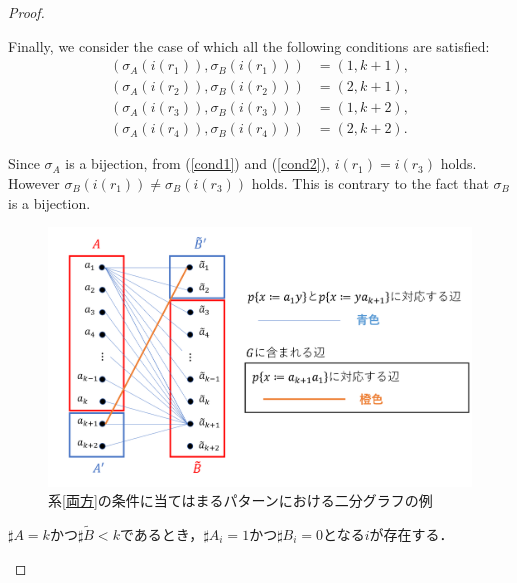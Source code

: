 \begin{proof}
\begin{enumerate}
\begin{enumerate}
Finally, we consider the case of which all the following conditions are satisfied:
\begin{align}
(\sigma_{A}(i(r_{1})), \sigma_{B}(i(r_{1}))) &= (1, k + 1),\label{cond1}\\
(\sigma_{A}(i(r_{2})), \sigma_{B}(i(r_{2}))) &= (2, k + 1),\\
(\sigma_{A}(i(r_{3})), \sigma_{B}(i(r_{3}))) &= (1, k + 2),\label{cond2}\\
(\sigma_{A}(i(r_{4})), \sigma_{B}(i(r_{4}))) &= (2, k + 2).
\end{align}

Since $\sigma_{A}$ is a bijection, from (\ref{cond1}) and (\ref{cond2}), $i(r_{1}) = i(r_{3})$ holds.
However $\sigma_{B}(i(r_{1})) \not= \sigma_{B}(i(r_{3}))$ holds.
This is contrary to the fact that $\sigma_{B}$ is a bijection.

\begin{figure}[t]
\centering
\includegraphics[width=\linewidth]{figs/Exam-BipartiteGraph-Corollary.png}
\caption{系\ref{両方}の条件に当てはまるパターンにおける二分グラフの例}
\label{系との関係}
\end{figure}

\smallskip

$\sharp A = k$かつ$\sharp \tilde{B} < k$であるとき，$\sharp A_{i}=1$かつ$\sharp B_{i}=0$となる$i$が存在する．


\end{enumerate}
\end{enumerate}
\end{proof}
